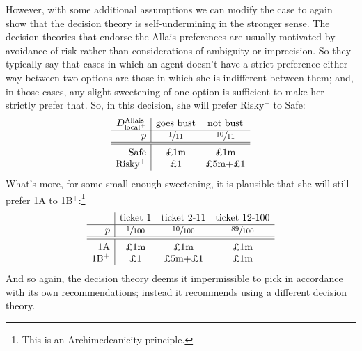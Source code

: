 \documentclass[a4paper,final]{article}
\newcommand\Tstrut{\rule{0pt}{2.6ex}}       %
\newcommand\Bstrut{\rule[-0.9ex]{0pt}{0pt}} %
\newenvironment{CCM rewritten}
{\begingroup\color{blue}} %
{\endgroup}              %
\begin{document}

However, with some additional assumptions we can modify the case to again show that the decision theory is self-undermining in the stronger sense. 
The decision theories that endorse the Allais preferences are usually motivated by avoidance of risk rather than considerations of ambiguity or imprecision. So they typically say that cases in which an agent doesn't have a strict preference either way between two options are those in which  she is indifferent between them; and, in those cases, any slight sweetening of one option is sufficient to make her strictly prefer  that. %
So, in this decision, she will prefer Risky$^+$ to Safe:
$$
\begin{array}{r|cc}
 D^{\mathrm{Allais}}_{\mathrm{local}^+} & \text{goes bust} &  \text{not bust}  \Bstrut\\\hline
	p & \sfrac{1}{11} & \sfrac{10}{11}\Bstrut\\\hline\hline\Tstrut
	\text{Safe} &\text{\pounds 1m}&\text{\pounds 1m}                      \\
	\text{Risky$^+$} & \text{\pounds 1}&\text{\pounds 5m+\pounds 1}
\end{array}
$$ What's more, for some small enough sweetening, it is plausible that she will still prefer 1A to 1B$^+$:\footnote{This is an Archimedeanicity principle.}
$$
\begin{array}{r|cccc}
	& \text{ticket 1} &\text{ticket 2-11}& \text{ticket 12-100}\Bstrut\\\hline
	p & \sfrac{1}{100} & \sfrac{10}{100} & \sfrac{89}{100} \Bstrut\\\hline\hline\Tstrut
	\text{1A} & \text{\pounds 1m} & \text{\pounds 1m}  & \text{\pounds 1m} \\
	\text{1B$^+$} & \text{\pounds 1} & \text{\pounds 5m+\pounds1}  & \text{\pounds 1m}
\end{array}
$$
And so again, the decision theory deems it impermissible to pick in accordance with its own recommendations; instead it recommends using a different decision theory. 
\end{document}
